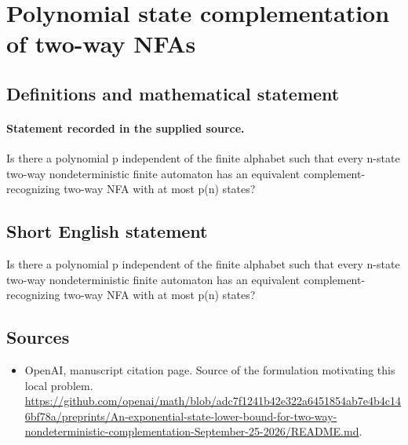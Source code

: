 \documentclass[11pt]{article}
\begin{document}
\section*{Polynomial state complementation of two-way NFAs}\label{30007489}
\subsection{Definitions and mathematical statement}
\paragraph{Statement recorded in the supplied source.}
Is there a polynomial p independent of the finite alphabet such that every n-state two-way nondeterministic finite automaton has an equivalent complement-recognizing two-way NFA with at most p(n) states?
\subsection{Short English statement}
Is there a polynomial p independent of the finite alphabet such that every n-state two-way nondeterministic finite automaton has an equivalent complement-recognizing two-way NFA with at most p(n) states?
\subsection{Sources}
\begin{itemize}
\item[S1] OpenAI, manuscript citation page. Source of the formulation motivating this local problem.
\url{https://github.com/openai/math/blob/adc7f1241b42e322a6451854ab7e4b4c146bf78a/preprints/An-exponential-state-lower-bound-for-two-way-nondeterministic-complementation-September-25-2026/README.md}.
\end{itemize}
\end{document}
